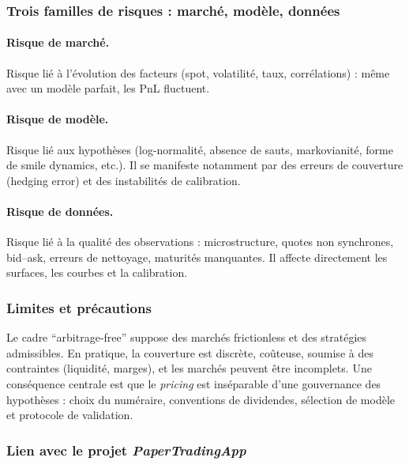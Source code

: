\documentclass[11pt,a4paper]{article}
\newcommand{\1}{\mathbf{1}}
\begin{document}
\subsubsection{Trois familles de risques : march\'e, mod\`ele, donn\'ees}

\paragraph{Risque de march\'e.}
Risque li\'e \`a l'\'evolution des facteurs (spot, volatilité, taux, corr\'elations) : m\^eme avec un mod\`ele parfait,
les PnL fluctuent.

\paragraph{Risque de mod\`ele.}
Risque li\'e aux hypoth\`eses (log-normalit\'e, absence de sauts, markovianit\'e, forme de smile dynamics, etc.).
Il se manifeste notamment par des erreurs de couverture (hedging error) et des instabilit\'es de calibration.

\paragraph{Risque de donn\'ees.}
Risque li\'e \`a la qualit\'e des observations : microstructure, quotes non synchrones, bid--ask, erreurs de
nettoyage, maturit\'es manquantes. Il affecte directement les surfaces, les courbes et la calibration.

\subsubsection{Limites et pr\'ecautions}

Le cadre ``arbitrage-free'' suppose des march\'es frictionless et des strat\'egies admissibles. En pratique,
la couverture est discr\`ete, co\^uteuse, soumise \`a des contraintes (liquidit\'e, marges), et les march\'es peuvent
\^etre incomplets. Une cons\'equence centrale est que le \emph{pricing} est ins\'eparable d'une gouvernance des
hypoth\`eses : choix du num\'eraire, conventions de dividendes, s\'election de mod\`ele et protocole de validation.

\subsubsection{Lien avec le projet \emph{PaperTradingApp}}
\end{document}
